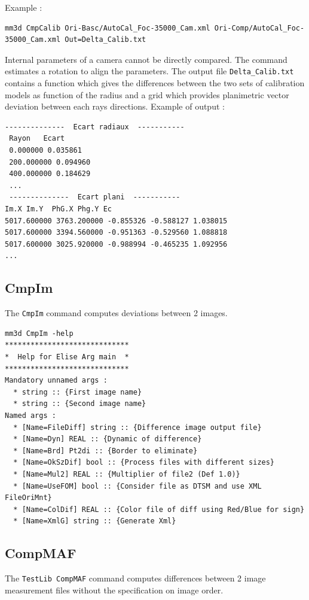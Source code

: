 Example :
\begin{verbatim}
mm3d CmpCalib Ori-Basc/AutoCal_Foc-35000_Cam.xml Ori-Comp/AutoCal_Foc-35000_Cam.xml Out=Delta_Calib.txt
\end{verbatim}

Internal parameters of a camera cannot be directly compared. The command estimates a rotation to align the parameters.
The output file {\tt Delta\_Calib.txt} contains a function which gives the differences between the two sets of calibration models as function of the radius and 
a grid which provides planimetric vector deviation between each rays directions. Example of output :

\begin{verbatim}
--------------  Ecart radiaux  -----------
 Rayon   Ecart
 0.000000 0.035861
 200.000000 0.094960
 400.000000 0.184629
 ...
 --------------  Ecart plani  -----------
Im.X Im.Y  PhG.X Phg.Y Ec
5017.600000 3763.200000 -0.855326 -0.588127 1.038015
5017.600000 3394.560000 -0.951363 -0.529560 1.088818
5017.600000 3025.920000 -0.988994 -0.465235 1.092956
...
\end{verbatim}

\subsection{CmpIm}
The {\tt CmpIm} command computes deviations between 2 images.

\begin{verbatim}
mm3d CmpIm -help
*****************************
*  Help for Elise Arg main  *
*****************************
Mandatory unnamed args : 
  * string :: {First image name}
  * string :: {Second image name}
Named args : 
  * [Name=FileDiff] string :: {Difference image output file}
  * [Name=Dyn] REAL :: {Dynamic of difference}
  * [Name=Brd] Pt2di :: {Border to eliminate}
  * [Name=OkSzDif] bool :: {Process files with different sizes}
  * [Name=Mul2] REAL :: {Multiplier of file2 (Def 1.0)}
  * [Name=UseFOM] bool :: {Consider file as DTSM and use XML FileOriMnt}
  * [Name=ColDif] REAL :: {Color file of diff using Red/Blue for sign}
  * [Name=XmlG] string :: {Generate Xml}

\end{verbatim}
\subsection{CompMAF}
The {\tt TestLib CompMAF} command computes differences between 2 image measurement files without the specification on image order.

